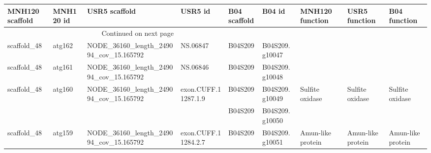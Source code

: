 \begin{longtable}{lllllllll}
\toprule
MNH120 scaffold & MNH120 id &                           USR5 scaffold &               USR5 id & B04 scaffold &          B04 id &                                                                 MNH120 function &                                                                   USR5 function &                                                                    B04 function \\
\midrule
\endhead
\midrule
\multicolumn{3}{r}{{Continued on next page}} \\
\midrule
\endfoot

\bottomrule
\endlastfoot
    scaffold\_48 &    atg162 &  NODE\_36160\_length\_249094\_cov\_15.165792 &              NS.06847 &      B04S209 &  B04S209.g10047 &                                                                                 &                                                                                 &                                                                                 \\
    scaffold\_48 &    atg161 &  NODE\_36160\_length\_249094\_cov\_15.165792 &              NS.06846 &      B04S209 &  B04S209.g10048 &                                                                                 &                                                                                 &                                                                                 \\
    scaffold\_48 &    atg160 &  NODE\_36160\_length\_249094\_cov\_15.165792 &   exon.CUFF.11287.1.9 &      B04S209 &  B04S209.g10049 &                                                                 Sulfite oxidase &                                                                 Sulfite oxidase &                                                                 Sulfite oxidase \\
                &           &                                         &                       &      B04S209 &  B04S209.g10050 &                                                                                 &                                                                                 &                                                                                 \\
    scaffold\_48 &    atg159 &  NODE\_36160\_length\_249094\_cov\_15.165792 &   exon.CUFF.11284.2.7 &      B04S209 &  B04S209.g10051 &                                                               Amun-like protein &                                                               Amun-like protein &                                                               Amun-like protein \\

\end{longtable}

